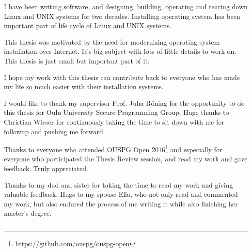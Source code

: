 \documentclass[a4paper,12pt,titlepage]{dithesis}
\begin{document}

I have been writing software, and designing, building, operating and
tearing down Linux and UNIX systems for two decades. Installing
operating system has been important part of life cycle of Linux and
UNIX systems.

This thesis was motivated by the need for modernizing operating system
installation over Internet. It's big subject with lots of little
details to work on. This thesis is just small but important part of
it.

I hope my work with this thesis can contribute back to everyone who
has made my life so much easier with their installation systems.

I would like to thank my supervisor Prof. Juha Röning for the
opportunity to do this thesis for Oulu University Secure Programming
Group. Huge thanks to Christian Wieser for continuously taking the
time to sit down with me for followup and pushing me forward.

Thanks to everyone who attended OUSPG Open
2016\footnote{https://github.com/ouspg/ouspg-open} and especially for
everyone who participated the Thesis Review session, and read my work
and gave feedback. Truly appreciated.

Thanks to my dad and sister for taking the time to read my work and
giving valuable feedback. Hugs to my spouse Ella, who not only read
and commented my work, but also endured the process of me writing it
while also finishing her master's degree.




\setlongtables
\begin{longtable}[l]{p{3cm}p{}}
  
\end{longtable}
\setcounter{table}{0}

\end{document}
